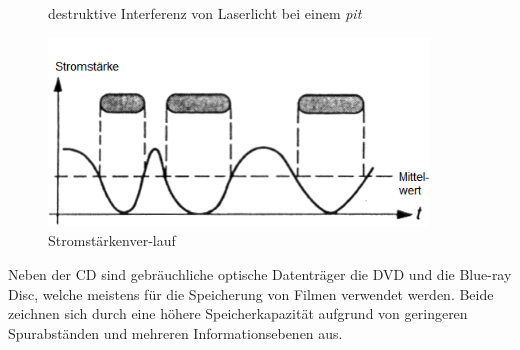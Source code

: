 {\begin{figure}[h]
\begin{center}
\begin{minipage}[t]{0.3\textwidth}
\begin{center}
                    \caption[destruktive Interferenz von Laserlicht bei einem \textit{pit} \newline \url{http://www.muenster.de/~asshoff/physik/cd/image50.gif} (zuletzt aufgerufen am 07.08.2015)]{destruktive Interferenz von Laserlicht bei einem \textit{pit}}
                    \label{fig:cdlaser}
                \end{center}
            \end{minipage}
            \hspace{0.025\textwidth}
            \begin{minipage}[t]{0.3\textwidth}
                \begin{center}
                    \includegraphics[width=0.9\textwidth]{Bilder/Optische_Datentraeger_Die_Compact_Disc/Funktionsweise/cdstrom.png}
                    \caption[Stromstärkenverlauf \newline \url{http://www.muenster.de/~asshoff/physik/cd/image51.gif} (zuletzt aufgerufen am 07.08.2015)]{Stromstärkenver-lauf}
                    \label{fig:cdstrom}
                \end{center}
            \end{minipage}
        \end{center}
    \end{figure}
}{}

Neben der CD sind gebräuchliche optische Datenträger die DVD und die Blue-ray
Disc, welche meistens für die Speicherung von Filmen verwendet werden. Beide
zeichnen sich durch eine höhere Speicherkapazität aufgrund von geringeren
Spurabständen und mehreren Informationsebenen aus.
